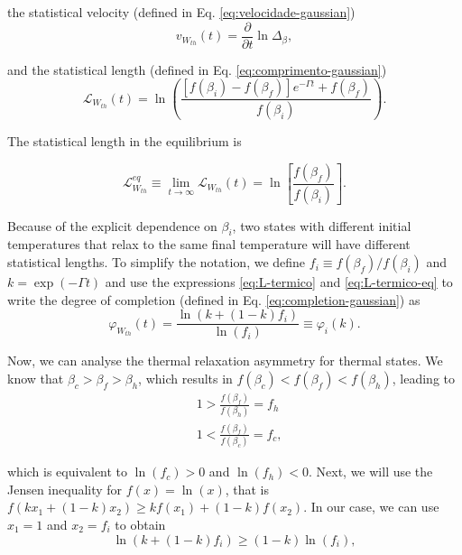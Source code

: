 \noindent the statistical velocity (defined in Eq. \eqref{eq:velocidade-gaussian})
\begin{equation}
    v_{W_{th}}(t) = \frac{\partial}{\partial t} \ln \Delta_\beta,
\end{equation}

\noindent and the statistical length (defined in Eq. \eqref{eq:comprimento-gaussian})
\begin{equation}
     \mathcal{L}_{W_{th}} (t) = \ln \left( \frac{[f(\beta_i) - f(\beta_f)]e^{-\Gamma t} + f(\beta_f)}{f(\beta_i)} \right).
     \label{eq:L-termico}
\end{equation}

\noindent The statistical length in the equilibrium is

\begin{equation}
    \mathcal{L}_{W_{th}}^{eq} \equiv \lim_{t \rightarrow \infty} \mathcal{L}_{W_{th}} (t) = \ln\left[ \frac{f(\beta_f)}{f(\beta_i)} \right].
    \label{eq:L-termico-eq}
\end{equation}

\noindent Because of the explicit dependence on $\beta_i$, two states with different initial temperatures that relax to the same final temperature will have different statistical lengths. To simplify the notation, we define $f_i \equiv f(\beta_f)/f(\beta_i)$ and $k = \exp(-\Gamma t)$ and use the expressions \eqref{eq:L-termico} and \eqref{eq:L-termico-eq} to write the degree of completion (defined in Eq. \eqref{eq:completion-gaussian}) as
\begin{equation}
    \varphi_{W_{th}}(t) = \frac{\ln (k + (1-k)f_i)}{\ln(f_i)} \equiv \varphi_{i}(k).
    \label{eq:completion-thermal}
\end{equation}

Now, we can analyse the thermal relaxation asymmetry for thermal states. We know that $\beta_c > \beta_f > \beta_h$, which results in $f(\beta_c) < f(\beta_f) < f(\beta_h)$, leading to 
\begin{align}
    &1 > \frac{f(\beta_f)}{f(\beta_h)} = f_h \label{ineq:fbeta-cooling}\\
    &1 < \frac{f(\beta_f)}{f(\beta_c)} = f_c, \label{ineq:fbeta-heating}
\end{align}

\noindent which is equivalent to $\ln(f_c) > 0$ and $\ln(f_h) < 0$. Next, we will use the Jensen inequality for $f(x) = \ln(x)$, that is $f(k x_1 + (1 - k) x_2) \geq kf(x_1) + (1-k) f(x_2)$. In our case, we can use $x_1 = 1$ and $x_2 = f_i$ to obtain
\begin{equation}
    \ln(k + (1 - k) f_i) \geq (1-k) \ln(f_i),
    \label{eq:jensen}
\end{equation}

